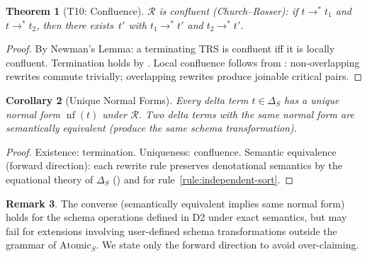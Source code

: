 \documentclass[11pt,a4paper]{article}
\newtheorem{theorem}{Theorem}[section]
\newtheorem{corollary}[theorem]{Corollary}
\theoremstyle{definition}
\newtheorem{remark}[theorem]{Remark}
\newcommand{\DeltaS}{\Delta_{\!S}}
\DeclareMathOperator{\nf}{nf}
\begin{document}
\begin{theorem}[T10: Confluence]\label{thm:confluence}
$\mathcal{R}$ is confluent (Church--Rosser): if $t \to^* t_1$ and $t \to^* t_2$,
then there exists~$t'$ with $t_1 \to^* t'$ and $t_2 \to^* t'$.
\end{theorem}

\begin{proof}
By Newman's Lemma: a terminating TRS is confluent iff it is locally confluent.
Termination holds by .  Local confluence follows from
: non-overlapping rewrites commute trivially; overlapping
rewrites produce joinable critical pairs.
\end{proof}

\begin{corollary}[Unique Normal Forms]\label{cor:unique-nf}
Every delta term $t \in \DeltaS$ has a unique normal form $\nf(t)$ under
$\mathcal{R}$.  Two delta terms with the same normal form are semantically
equivalent (produce the same schema transformation).
\end{corollary}

\begin{proof}
Existence: termination.  Uniqueness: confluence.  Semantic equivalence
(forward direction): each rewrite rule preserves denotational semantics
by the equational theory of $\DeltaS$ () and
 for rule~\ref{rule:independent-sort}.
\end{proof}

\begin{remark}
The converse (semantically equivalent implies same normal form) holds for the
schema operations defined in D2 under exact semantics, but may fail for
extensions involving user-defined schema transformations outside the grammar
of $\mathrm{Atomic}_S$.  We state only the forward direction to avoid
over-claiming.
\end{remark}
\end{document}
